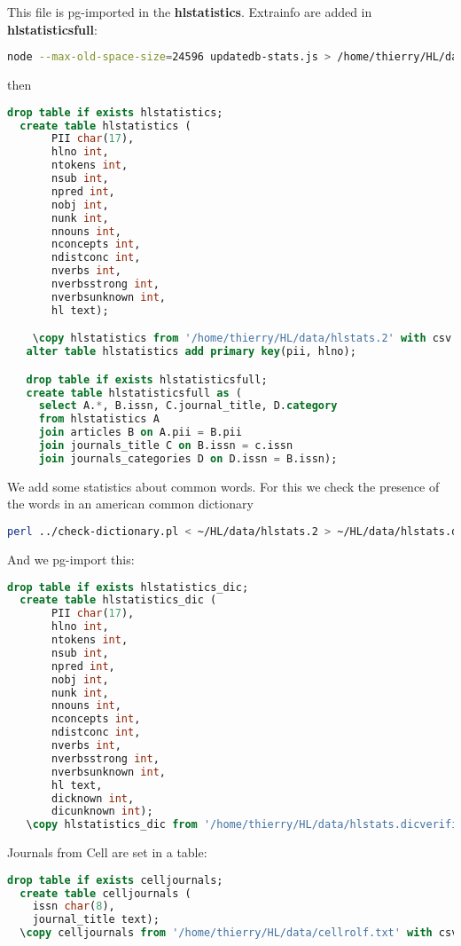 \documentclass[a4paper,11pt]{report}
\newcommand{\cs}[1]{{\bfseries \ttfamily #1}}
\begin{document}
This file is pg-imported in the \cs{hlstatistics}. Extrainfo are added in \cs{hlstatisticsfull}:
\begin{lstlisting}[language=bash]
  node --max-old-space-size=24596 updatedb-stats.js > /home/thierry/HL/data/out/hlstats.2
\end{lstlisting}
then
\begin{lstlisting}[language=SQL]
  drop table if exists hlstatistics;
  create table hlstatistics (
       PII char(17),
       hlno int,
       ntokens int,
       nsub int,
       npred int,
       nobj int,
       nunk int,
       nnouns int,
       nconcepts int,
       ndistconc int,
       nverbs int,
       nverbsstrong int,
       nverbsunknown int,
       hl text);

    \copy hlstatistics from '/home/thierry/HL/data/hlstats.2' with csv delimiter E'\t' quote E'\b' header;
   alter table hlstatistics add primary key(pii, hlno);

   drop table if exists hlstatisticsfull;
   create table hlstatisticsfull as (
     select A.*, B.issn, C.journal_title, D.category
     from hlstatistics A
     join articles B on A.pii = B.pii
     join journals_title C on B.issn = c.issn
     join journals_categories D on D.issn = B.issn);
\end{lstlisting}
We add some statistics about common words. For this we check the presence of the words in an american common dictionary
\begin{lstlisting}[language=bash]
  perl ../check-dictionary.pl < ~/HL/data/hlstats.2 > ~/HL/data/hlstats.dicverified
\end{lstlisting}
And we pg-import this:
\begin{lstlisting}[language=SQL]
  drop table if exists hlstatistics_dic;
  create table hlstatistics_dic (
       PII char(17),
       hlno int,
       ntokens int,
       nsub int,
       npred int,
       nobj int,
       nunk int,
       nnouns int,
       nconcepts int,
       ndistconc int,
       nverbs int,
       nverbsstrong int,
       nverbsunknown int,
       hl text,
       dicknown int,
       dicunknown int);
   \copy hlstatistics_dic from '/home/thierry/HL/data/hlstats.dicverified' with csv delimiter E'\t' quote E'\b' header;
\end{lstlisting}
Journals from Cell are set in a table:
\begin{lstlisting}[language=SQL]
  drop table if exists celljournals;
  create table celljournals (
    issn char(8),
    journal_title text);
  \copy celljournals from '/home/thierry/HL/data/cellrolf.txt' with csv delimiter E'\t' quote E'\b';
\end{lstlisting}
\end{document}
